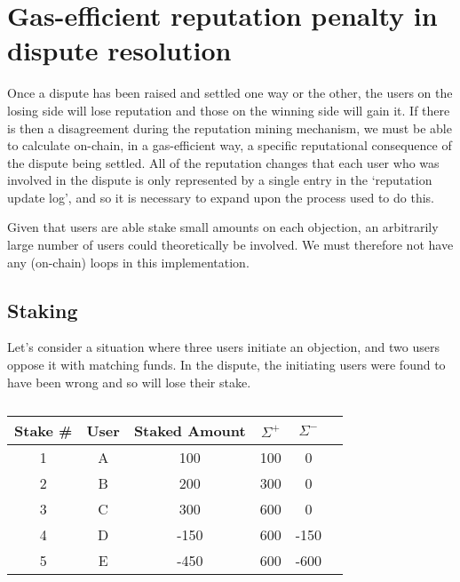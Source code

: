 \clearpage
\section{Gas-efficient reputation penalty in dispute resolution}\label{appendix:rep-transfer}

Once a dispute has been raised and settled one way or the other, the users on the losing side will lose reputation and those on the winning side will gain it. If there is then a disagreement during the reputation mining mechanism, we must be able to calculate on-chain, in a gas-efficient way, a specific reputational consequence of the dispute being settled. All of the reputation changes that each user who was involved in the dispute is only represented by a single entry in the `reputation update log', and so it is necessary to expand upon the process used to do this.

Given that users are able stake small amounts on each objection, an arbitrarily large number of users could theoretically be involved. We must therefore not have any (on-chain) loops in this implementation.

\subsection{Staking}

Let's consider a situation where three users initiate an objection, and two users oppose it with matching funds. In the dispute, the initiating users were found to have been wrong and so will lose their stake.

\begin{table}[h]
\centering
\caption{}
\begin{tabular}{|c|c|c|c|c|c|}
\hline
Stake \# & User  & Staked Amount & $\Sigma^+$ & $\Sigma^-$ \\ \hline
1 & A & 100           & 100                      & 0                                                                       \\ \hline
2 & B & 200           & 300                      & 0                                                                       \\ \hline
3 & C & 300           & 600                      & 0                                                                       \\ \hline
4 & D & -150          & 600                      & -150                                                                    \\ \hline
5 & E & -450          & 600                      & -600                                                                    \\ \hline
\end{tabular}
\end{table}

